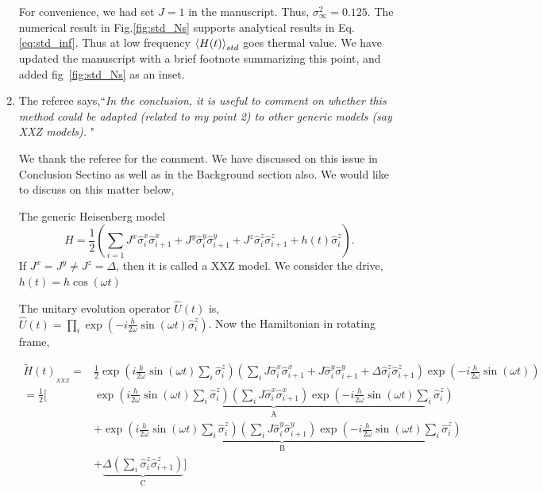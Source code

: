 \documentclass[aps,prb,reprint,showpacs,floatfix,superscriptaddress, onecolumn, nofootinbib, 9pt]{revtex4-2}
\newcommand{\response}[1]{{\color{blue}#1}} %
\begin{document}
\begin{enumerate}
{			For convenience, we had set $J=1$ in the manuscript. Thus, $\sigma_\infty^2 = 0.125$. The numerical result in Fig.\ref{fig:std_Ns} supports analytical results in Eq. \eqref{eq:std_inf}. Thus at low frequency $\expval{H(t)}_{std}$ goes thermal value. We have updated the manuscript with a brief footnote summarizing this point, and added fig~\ref{fig:std_Ns} as an inset.
		}
		
		
		\vskip 2cm
		\item The referee says,``\textit{In the conclusion, it is useful to comment on whether this method could be adapted (related to my point 2) to other generic models (say
			XXZ models). }"\\
		
		\response{
		We thank the referee for the comment. We have discussed on this issue in Conclusion Sectino as well as in the Background section also.
		We would like to discuss on this matter below, 

		The generic Heisenberg model
		\begin{equation*}
			H = \frac12 \left( \sum_{i=1} J^x \hat{\sigma}^x_i \hat{\sigma}^x_{i+1} +J^y  \hat{\sigma}^y_i \hat{\sigma}^y_{i+1} + J^z  \hat{\sigma}^z_i \hat{\sigma}^z_{i+1} + h(t)  \hat{\sigma}^z_i\right).
		\end{equation*}
		If $J^x= J^y \neq J^z=\Delta$, then it is called a XXZ model. We consider the drive, $h(t) = h \cos(\omega t)$
		
		The unitary evolution operator $\displaystyle \hat{U}(t)$ is, $\hat{U}(t)=\prod_{i} \exp \left(-i \frac{h}{2 \omega} \sin (\omega t) \hat{\sigma}_{i}^{z}\right)$. Now the Hamiltonian in rotating frame,
		
		\begin{align}
			\tilde{H}(t)_{_{XXZ}}= & \frac{1}{2} \exp \left(i \frac{h}{2 \omega} \sin (\omega t) \sum_{i} \hat{\sigma}_{i}^{z}\right)\left(\sum_{i} J \hat{\sigma}^x_i \hat{\sigma}^x_{i+1} + J \hat{\sigma}^y_i \hat{\sigma}^y_{i+1}+ \Delta  \hat{\sigma}^z_i \hat{\sigma}^z_{i+1}\right) \exp \left(-i \frac{h}{2 \omega} \sin (\omega t)\right)\nonumber\\
			= \frac12 \Bigg[& \underbrace{\exp \left(i \frac{h}{2 \omega} \sin (\omega t) \sum_{i} \hat{\sigma}_{i}^{z}\right)\left(\sum_{i} J \hat{\sigma}_{i}^{x} \hat{\sigma}_{i+1}^{x}\right) \exp \left(-i \frac{h}{2 \omega} \sin (\omega t) \sum_i\hat{\sigma}_{i}^{z}\right)}_{\mathrm{A}} \nonumber\\
			& +\underbrace{\exp \left(i \frac{h}{2 \omega} \sin (\omega t) \sum_{i} \hat{\sigma}_{i}^{z}\right)\left(\sum_{i} J \hat{\sigma}_{i}^{y} \hat{\sigma}_{i+1}^{y}\right) \exp \left(-i \frac{h}{2 \omega} \sin (\omega t) \sum_i\hat{\sigma}_{i}^{z}\right)}_{\mathrm{B}} \nonumber\\
			& +\underbrace{\Delta \left(\sum_{i}  \hat{\sigma}_{i}^{z} \hat{\sigma}_{i+1}^{z}\right)}_{\mathrm{C}}\Bigg]
			\label{eq:xxz1}
		\end{align}
	
}
\end{enumerate}
\end{document}
